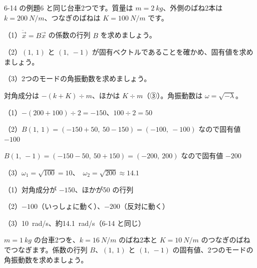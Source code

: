 \begin{reidai}[台車の振動モード]
6-14 の例題6 と同じ台車2つです。質量は $m=\qty{2}{kg}$、外側のばね2本は $k=\qty{200}{N/m}$、つなぎのばねは $K=\qty{100}{N/m}$ です。\par
（1）$\ddot{\vec x}=B\vec x$ の係数の行列 $B$ を求めましょう。\par
（2）$(1,\ 1)$ と $(1,\ -1)$ が固有ベクトルであることを確かめ、固有値を求めましょう。\par
（3）2つのモードの角振動数を求めましょう。\par
\kangaekata 対角成分は $-(k+K)\div m$、ほかは $K\div m$（③）。角振動数は $\omega=\sqrt{-\lambda}$。\par
\shiki\kviiis{}\zw{} （1）$-(200+100)\div2=-150$、$100\div2=50$\par
\kviiia （2）$B(1,\ 1)=(-150+50,\ 50-150)=(-100,\ -100)$ なので固有値 $-100$\par
\kviiib $B(1,\ -1)=(-150-50,\ 50+150)=(-200,\ 200)$ なので固有値 $-200$\par
\kviiia （3）$\omega_1=\sqrt{100}=10$、\ $\omega_2=\sqrt{200}\approx14.1$\par
\kotae\kviiis{}\zw{} （1）対角成分が $-150$、ほかが50 の行列\par
\kviiia （2）$-100$（いっしょに動く）、$-200$（反対に動く）\par
\kviiia （3）\qty{10}{rad/s}、約\qty{14.1}{rad/s}（6-14 と同じ）
\end{reidai}

\begin{jibun}
$m=\qty{1}{kg}$ の台車2つを、$k=\qty{16}{N/m}$ のばね2本と $K=\qty{10}{N/m}$ のつなぎのばねでつなぎます。係数の行列 $B$、$(1,\ 1)$ と $(1,\ -1)$ の固有値、2つのモードの角振動数を求めましょう。
\end{jibun}

